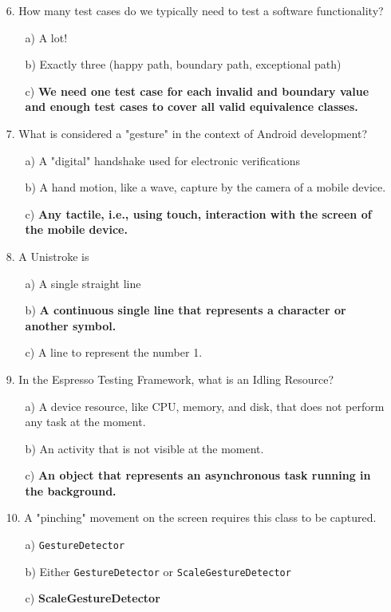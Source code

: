 \documentclass[12pt]{book}
\begin{document}
\begin{itemize}
    \item[6.] How many test cases do we typically need to test a software functionality?
    \begin{itemize}
        \item[a)] A lot!
        \item[b)] Exactly three (happy path, boundary path, exceptional path)
        \item[c)] \textbf{We need one test case for each invalid and boundary value and enough test cases to cover all valid equivalence classes.}
    \end{itemize}

    \item[7.] What is considered a "gesture" in the context of Android development?
    \begin{itemize}
        \item[a)] A "digital" handshake used for electronic verifications
        \item[b)] A hand motion, like a wave, capture by the camera of a mobile device.
        \item[c)] \textbf{Any tactile, i.e., using touch, interaction with the screen of the mobile device.}
    \end{itemize}

    \item[8.] A Unistroke is
    \begin{itemize}
        \item[a)] A single straight line
        \item[b)] \textbf{A continuous single line that represents a character or another symbol.}
        \item[c)] A line to represent the number 1.
    \end{itemize}

    \item[9.] In the Espresso Testing Framework, what is an Idling Resource?
    \begin{itemize}
        \item[a)] A device resource, like CPU, memory, and disk, that does not perform any task at the moment.
        \item[b)] An activity that is not visible at the moment.
        \item[c)] \textbf{An object that represents an asynchronous task running in the background.}
    \end{itemize}

    \item[10.] A "pinching" movement on the screen requires this class to be captured.
    \begin{itemize}
        \item[a)] \texttt{GestureDetector}
        \item[b)] Either \texttt{GestureDetector} or \texttt{ScaleGestureDetector}
        \item[c)] \textbf{ScaleGestureDetector}
    \end{itemize}

\end{itemize}
\end{document}
